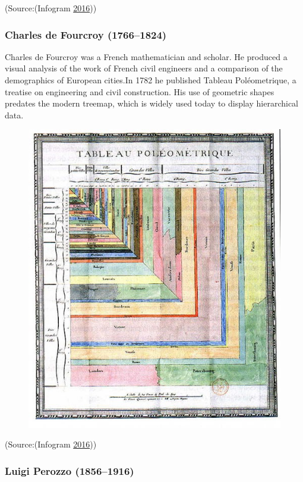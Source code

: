 \documentclass[]{book}
\theoremstyle{definition}
\theoremstyle{definition}
\theoremstyle{definition}
\theoremstyle{remark}
\begin{document}
(Source:(Infogram \protect\hyperlink{ref-history_viz}{2016}))

\subsubsection{Charles de Fourcroy
(1766--1824)}\label{charles-de-fourcroy-17661824}

Charles de Fourcroy was a French mathematician and scholar. He produced
a visual analysis of the work of French civil engineers and a comparison
of the demographics of European cities.In 1782 he published Tableau
Poléometrique, a treatise on engineering and civil construction. His use
of geometric shapes predates the modern treemap, which is widely used
today to display hierarchical data.

\begin{figure}
\centering
\includegraphics{images/Charles.png}
\caption{}
\end{figure}

(Source:(Infogram \protect\hyperlink{ref-history_viz}{2016}))

\subsubsection{Luigi Perozzo (1856--1916)}\label{luigi-perozzo-18561916}
\end{document}

